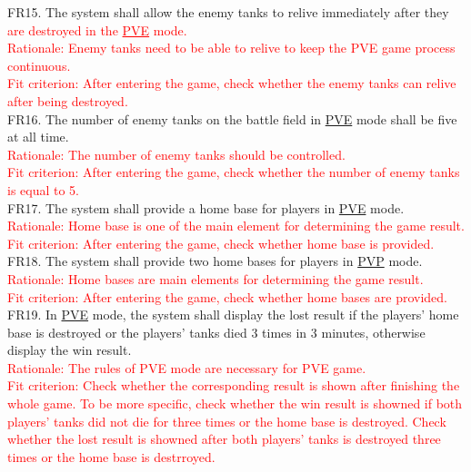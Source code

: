\documentclass[12pt, titlepage]{article}
\begin{document}
  FR15. The system shall allow the enemy tanks to relive immediately after they \textcolor{red}{are destroyed in the \underline{PVE} mode.\\
  Rationale: Enemy tanks need to be able to relive to keep the PVE game process continuous.\\
  Fit criterion: After entering the game, check whether the enemy tanks can relive after being destroyed.}\\ \newline
  FR16. The number of enemy tanks on the battle field in \underline{PVE} mode shall be five at all time.\\
  \textcolor{red}{Rationale: The number of enemy tanks should be controlled. \\
  Fit criterion: After entering the game, check whether the number of enemy tanks is equal to 5.}\\ \newline
  FR17. The system shall provide a home base for players in \underline{PVE} mode.\\
  \textcolor{red}{Rationale: Home base is one of the main element for determining the game result.\\
  Fit criterion: After entering the game, check whether home base is provided.}\\ \newline
  FR18. The system shall provide two home bases for players in \underline{PVP} mode.\\
  \textcolor{red}{Rationale: Home bases are main elements for determining the game result.\\
  Fit criterion: After entering the game, check whether home bases are provided.}\\ \newline
  FR19. In \underline{PVE} mode, the system shall display the lost result if the players' home base is destroyed or the players' tanks died 3 times in 3 minutes, otherwise display the win result.\\
  \textcolor{red}{Rationale: The rules of PVE mode are necessary for PVE game.\\
  Fit criterion: Check whether the corresponding result is shown after finishing the whole game. To be more specific, check whether the win result is showned if both players' tanks did not die for three times or the home base is destroyed. Check whether the lost result is showned after both players' tanks is destroyed three times or the home base is destrroyed.}\\ \newline
\end{document}
